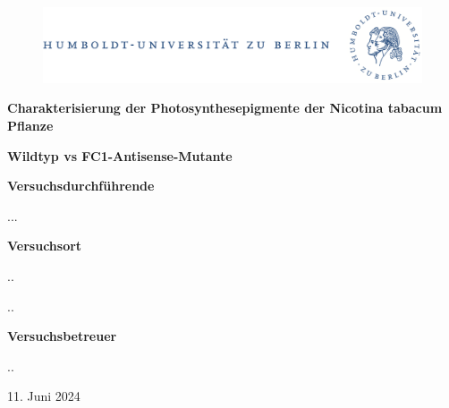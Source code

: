 \documentclass[10pt,a4paper]{article}
\begin{document}
	
	\begin{titlepage}
		\begin{center}
			\begin{figure}[h!tbp]
				\includegraphics[width=\linewidth]{HUlogo.PNG}
			\end{figure}
			\vspace*{2 cm}
			
			\textcolor{Bluetitle}{\textbf{\huge Charakterisierung
					der Photosynthesepigmente der Nicotina tabacum Pflanze}}\par
			\vspace*{0.5cm}
			\textcolor{softbluetitle}{\textbf{\Large Wildtyp vs FC1-Antisense-Mutante}}\par
			
			\vspace*{2cm}
			
			\textcolor{Greyish}{\textbf{Versuchsdurchführende}}\par
			\textcolor{Greyish}{...}\par

			\vspace*{0.5cm}
			\textcolor{Greyish}{\textbf{Versuchsort}}\par
			\textcolor{Greyish}{..}\par
			\textcolor{Greyish}{..}\par
			\vspace*{0.5cm}
			\textcolor{Greyish}{\textbf{Versuchsbetreuer}}\par
			\textcolor{Greyish}{..}\par
			
			\vspace*{2 cm}
			
			\textcolor{Greyish}{11. Juni 2024}\par
			

			
			
		\end{center}
	\end{titlepage}
		
		\tableofcontents
		

	
	\newpage
\end{document}
